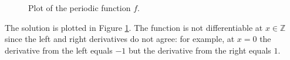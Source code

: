 \documentclass[11pt]{article}
\begin{document}
\begin{solution}
    \begin{figure}
    \centering
    \caption{Plot of the periodic function $f$.}
    \label{fig:ex5}
    \end{figure}
    The solution is plotted in Figure \ref{fig:ex5}. 
    The function is not differentiable at $x \in \mathbb{Z}$ since the left and right derivatives do not agree:
    for example, at $x=0$ the derivative from the left equals $-1$ but the derivative from the right equals $1$.
    

\end{solution}
\end{document}
